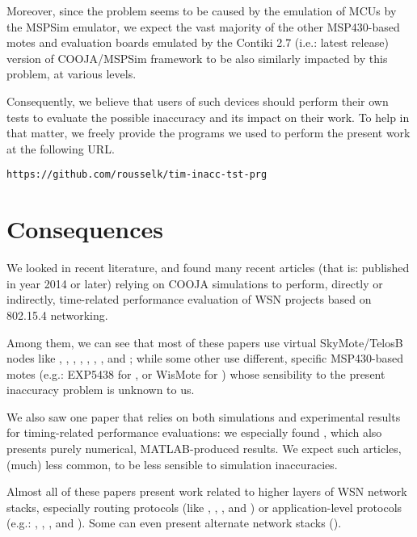 \documentclass[10pt]{ewsn-proc}
\begin{document}
\medskip

Moreover, since the problem seems to be caused by the emulation of
MCUs by the MSPSim emulator, we expect the vast majority of the other
MSP430-based motes and evaluation boards emulated by the Contiki 2.7
(i.e.: latest release) version of COOJA/MSPSim framework to be also similarly
impacted by this problem, at various levels.

Consequently, we believe that users of such devices should perform their
own tests to evaluate the possible inaccuracy and its impact on their work.
To help in that matter, we freely provide the programs we used to perform the
present work at the following URL.

\begin{center}
\texttt{\footnotesize https://github.com/rousselk/tim-inacc-tst-prg}
\end{center}



\section{Consequences}
\label{consequences}

We looked in recent literature, and found many recent articles (that is:
published in year 2014 or later) relying on COOJA simulations to perform,
directly or indirectly, time-related performance evaluation of WSN projects
based on 802.15.4 networking.

Among them, we can see that most of these papers use virtual SkyMote/TelosB
nodes like
\cite{Constrain-Routing-Trees-2014},
\cite{Co-RPL-2014}, \cite{DINAS-2014},
\cite{Efficient-Distrib-Svc-Discovery-2014},
\cite{IETF-Routing-WSN-2014},
\cite{TinySDN-2014}, \cite{Trickle-L2-2014},
and \cite{Visual-Sensor-Networks-2014};
while some other use different, specific MSP430-based motes
(e.g.: EXP5438 for \cite{Key-Mgmt-2015}, or WisMote for
\cite{Lightweight-Multicast-Forwarding-2014}) whose sensibility
to the present inaccuracy problem is unknown to us.

We also saw one paper that relies on both simulations and experimental
results for timing-related performance evaluations: we especially found
\cite{Probing-Mech-wu-2015}, which also presents purely numerical,
MATLAB-produced results. We expect such articles, (much) less common,
to be less sensible to simulation inaccuracies.

Almost all of these papers present work related to higher layers of
WSN network stacks, especially routing protocols (like
\cite{Constrain-Routing-Trees-2014},
\cite{Co-RPL-2014}, \cite{IETF-Routing-WSN-2014},
and \cite{Trickle-L2-2014})
or application-level protocols (e.g.: \cite{DINAS-2014},
\cite{Efficient-Distrib-Svc-Discovery-2014},
\cite{Visual-Sensor-Networks-2014}, and \cite{Key-Mgmt-2015}).
Some can even present alternate network stacks (\cite{TinySDN-2014}).
\end{document}
